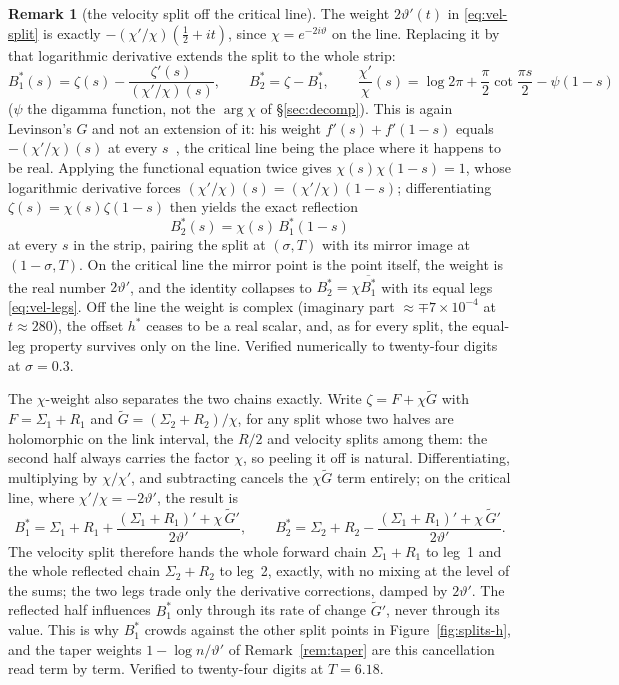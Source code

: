 \documentclass[11pt]{article}
\theoremstyle{definition}
\newtheorem{remark}[theorem]{Remark}
\begin{document}
\begin{remark}[the velocity split off the critical line]\label{rem:vel-offline}
The weight $2\vartheta'(t)$ in \eqref{eq:vel-split} is exactly
$-(\chi'/\chi)(\tfrac12+it)$, since $\chi=e^{-2i\vartheta}$ on the line.
Replacing it by that logarithmic derivative extends the split to the whole
strip:
\begin{equation}\label{eq:vel-split-offline}
B_1^{\ast}(s)=\zeta(s)-\frac{\zeta'(s)}{(\chi'/\chi)(s)},
\qquad
B_2^{\ast}=\zeta-B_1^{\ast},
\qquad
\frac{\chi'}{\chi}(s)=\log 2\pi+\frac{\pi}{2}\cot\frac{\pi s}{2}-\psi(1-s)
\end{equation}
($\psi$ the digamma function, not the $\arg\chi$ of \S\ref{sec:decomp}).
This is again Levinson's $G$ and not an extension of it: his weight
$f'(s)+f'(1-s)$ equals $-(\chi'/\chi)(s)$ at every
$s$~\cite{Levinson1974}, the critical line being the place where it happens to
be real.
Applying the functional equation twice gives $\chi(s)\chi(1-s)=1$, whose
logarithmic derivative forces $(\chi'/\chi)(s)=(\chi'/\chi)(1-s)$;
differentiating $\zeta(s)=\chi(s)\zeta(1-s)$ then yields the exact reflection
\[
B_2^{\ast}(s)=\chi(s)\,B_1^{\ast}(1-s)
\]
at every $s$ in the strip, pairing the split at $(\sigma,T)$ with its mirror
image at $(1-\sigma,T)$. On the critical line the mirror point is the point
itself, the weight is the real number $2\vartheta'$, and the identity
collapses to $B_2^{\ast}=\chi\overline{B_1^{\ast}}$ with its equal legs
\eqref{eq:vel-legs}. Off the line the weight is complex (imaginary part
$\approx\mp7\times10^{-4}$ at $t\approx280$), the offset $h^{\ast}$ ceases to
be a real scalar, and, as for every split, the equal-leg property survives
only on the line. Verified numerically to twenty-four digits at $\sigma=0.3$.

The $\chi$-weight also separates the two chains exactly. Write
$\zeta=F+\chi\widetilde G$ with $F=\Sigma_1+R_1$ and
$\widetilde G=(\Sigma_2+R_2)/\chi$, for any split whose two halves are
holomorphic on the link interval, the $R/2$ and velocity splits among them:
the second half always carries the factor $\chi$, so peeling it off is
natural.
Differentiating, multiplying by $\chi/\chi'$, and subtracting cancels the
$\chi\widetilde G$ term entirely; on the critical line, where
$\chi'/\chi=-2\vartheta'$, the result is
\begin{equation}\label{eq:vel-split-halves}
B_1^{\ast}
=\Sigma_1+R_1+\frac{(\Sigma_1+R_1)'+\chi\,\widetilde G'}{2\vartheta'},
\qquad
B_2^{\ast}
=\Sigma_2+R_2-\frac{(\Sigma_1+R_1)'+\chi\,\widetilde G'}{2\vartheta'}.
\end{equation}
The velocity split therefore hands the whole forward chain $\Sigma_1+R_1$ to
leg~1 and the whole reflected chain $\Sigma_2+R_2$ to leg~2, exactly, with no
mixing at the level of the sums; the two legs trade only the derivative
corrections, damped by $2\vartheta'$. The reflected
half influences $B_1^{\ast}$ only through its rate of change
$\widetilde G'$, never through its value. This is why $B_1^{\ast}$ crowds
against the other split points in Figure~\ref{fig:splits-h}, and the taper
weights $1-\log n/\vartheta'$ of Remark~\ref{rem:taper} are this cancellation
read term by term. Verified to twenty-four digits at $T=6.18$.
\end{remark}
\end{document}
